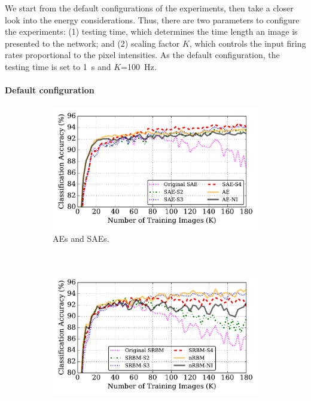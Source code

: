 We start from the default configurations of the experiments, then take a closer look into the energy considerations.
Thus, there are two parameters to configure the experiments: (1) testing time, which determines the time length an image is presented to the network; and (2) scaling factor $K$, which controls the input firing rates proportional to the pixel intensities.
As the default configuration, the testing time is set to 1~s and $K$=100~Hz.
 


\paragraph{Default configuration\\}

\begin{figure}
	\centering
	\begin{subfigure}[t]{0.8\textwidth}
		\includegraphics[width=\textwidth]{pics_sdlm/43_MNIST_SAE_all/compare_result.pdf}
		\caption{AEs and SAEs.}
	\end{subfigure}\\
	\begin{subfigure}[t]{0.8\textwidth}
		\includegraphics[width=\textwidth]{pics_sdlm/53_MNIST_SRBM_all/compare_result.pdf}

\end{subfigure}
\end{figure}
